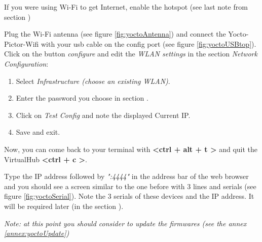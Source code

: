 If you were using Wi-Fi to get Internet, enable the hotspot (see last note from
section \pageref{sec:wifirugged})

Plug the Wi-Fi antenna (see figure \ref{fig:yoctoAntenna}) and connect the
Yocto-Pictor-Wifi with your usb cable on the config port (see figure \ref{fig:yoctoUSBtop}). 
Click on the button \emph{configure} and edit the \emph{WLAN settings} in the section 
\emph{Network Configuration}: 
\begin{enumerate}
		\item Select \emph{Infrastructure (choose an existing WLAN)}.
		\item Enter the password you choose in section \pageref{sec:wifirugged}.
		\item Click on \emph{Test Config} and note the displayed Current IP.
		\item Save and exit.
\end{enumerate}

Now, you can come back to your terminal with \textbf{\textless ctrl + alt + t \textgreater}
and quit the VirtualHub \textbf{\textless ctrl + c \textgreater}.

Type the IP address followed by \emph{":4444"} in the address bar of the web browser 
and you should see a screen similar to the one before with 3 lines and serials 
(see figure \ref{fig:yoctoSerial}). Note the 3 serials of these devices and the IP address. 
It will be required later (in the section \pageref{sec:yocto-config}).
\vspace{11pt}

\emph{Note: at this point you should consider to update the firmwares (see the
annex \ref{annex:yoctoUpdate})}

